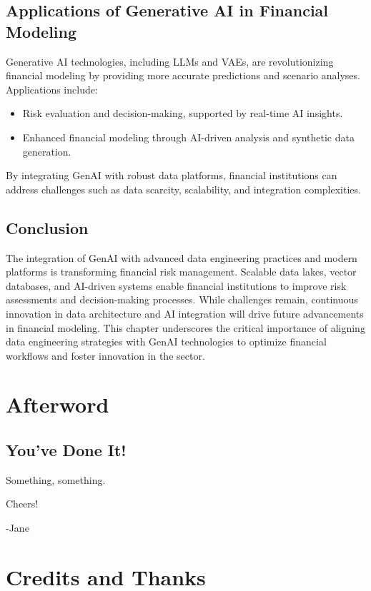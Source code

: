 \documentclass[a4paper,headinclude=on,footinclude=on,12pt,oneside]{scrbook}
\begin{document}
\section{Applications of Generative AI in Financial Modeling}
Generative AI technologies, including LLMs and VAEs, are revolutionizing financial modeling by providing more accurate predictions and scenario analyses. Applications include:
\begin{itemize}
	\item Risk evaluation and decision-making, supported by real-time AI insights.
	\item Enhanced financial modeling through AI-driven analysis and synthetic data generation.
\end{itemize}
By integrating GenAI with robust data platforms, financial institutions can address challenges such as data scarcity, scalability, and integration complexities.

\section{Conclusion}
The integration of GenAI with advanced data engineering practices and modern platforms is transforming financial risk management. Scalable data lakes, vector databases, and AI-driven systems enable financial institutions to improve risk assessments and decision-making processes. While challenges remain, continuous innovation in data architecture and AI integration will drive future advancements in financial modeling. This chapter underscores the critical importance of aligning data engineering strategies with GenAI technologies to optimize financial workflows and foster innovation in the sector.







\chapter*{Afterword}

\section*{You've Done It!}

Something, something.

Cheers! \beers

-Jane

\chapter*{Credits and Thanks}
\end{document}
